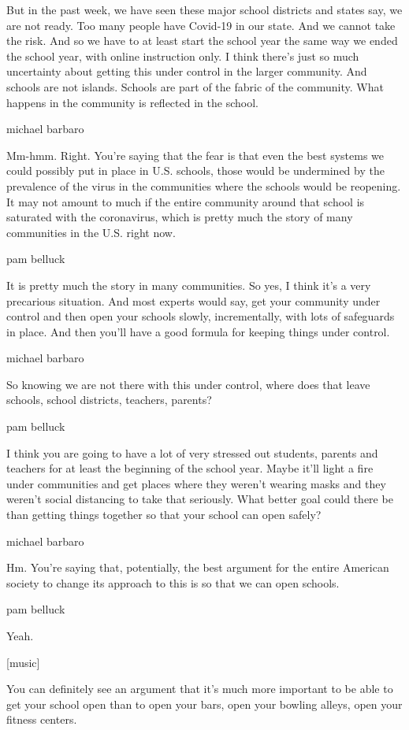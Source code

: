 But in the past week, we have seen these major school districts and
states say, we are not ready. Too many people have Covid-19 in our
state. And we cannot take the risk. And so we have to at least start the
school year the same way we ended the school year, with online
instruction only. I think there's just so much uncertainty about getting
this under control in the larger community. And schools are not islands.
Schools are part of the fabric of the community. What happens in the
community is reflected in the school.

michael barbaro

Mm-hmm. Right. You're saying that the fear is that even the best systems
we could possibly put in place in U.S. schools, those would be
undermined by the prevalence of the virus in the communities where the
schools would be reopening. It may not amount to much if the entire
community around that school is saturated with the coronavirus, which is
pretty much the story of many communities in the U.S. right now.

pam belluck

It is pretty much the story in many communities. So yes, I think it's a
very precarious situation. And most experts would say, get your
community under control and then open your schools slowly,
incrementally, with lots of safeguards in place. And then you'll have a
good formula for keeping things under control.

michael barbaro

So knowing we are not there with this under control, where does that
leave schools, school districts, teachers, parents?

pam belluck

I think you are going to have a lot of very stressed out students,
parents and teachers for at least the beginning of the school year.
Maybe it'll light a fire under communities and get places where they
weren't wearing masks and they weren't social distancing to take that
seriously. What better goal could there be than getting things together
so that your school can open safely?

michael barbaro

Hm. You're saying that, potentially, the best argument for the entire
American society to change its approach to this is so that we can open
schools.

pam belluck

Yeah.

{[}music{]}

You can definitely see an argument that it's much more important to be
able to get your school open than to open your bars, open your bowling
alleys, open your fitness centers.

